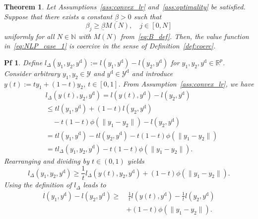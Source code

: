 \documentclass[10pt,a4paper]{amsart}
\newtheorem{thm}{Theorem}
\newtheorem{pf}{Pf}
\begin{document}
\begin{thm}\label{thm:coerc}	
	Let Assumptions~\ref{ass:convex_lr} and~\ref{ass:optimality} be satisfied.
	Suppose that there exists a constant $\underline{\beta}>0$ such that%
	\begin{equation}\label{eq:beta_lower_bound}
		\beta_j \geq \underline{\beta}M(N), \quad j\in[0,N]
	\end{equation}
	uniformly for all $N\in\mathbb{N}$ with $M(N)$ from~\eqref{eq:B_def}.
	Then, the value function in~\eqref{eq:NLP_case_1} is coercive in the sense of Definition~\ref{def:coerc}.
\end{thm}

\begin{pf}
	Define ${l}_\Delta(y_1,y_2,y^\mathrm{d}):= l(y_1,y^\mathrm{d}) - l(y_2,y^\mathrm{d})$ for $y_1,y_2,y^\mathrm{d}\in\mathbb{R}^p$.
	Consider arbitrary $y_1,y_2\in\mathcal{Y}$ and $y^\mathrm{d}\in\mathcal{Y}^\mathrm{d}$ and introduce $y(t) := ty_1 + (1-t)y_2$, $t\in[0,1]$.
	From Assumption~\ref{ass:convex_lr}, we have
	\begin{align*}
		&l_\Delta(y(t),y_2,y^\mathrm{d}) = l(y(t),y^\mathrm{d}) - l(y_2,y^\mathrm{d}) \\
		&\leq tl(y_1,y^\mathrm{d})+(1-t)l(y_2,y^\mathrm{d}) \\
		&\quad - t(1-t)\phi(\|y_1-y_2\|) - l(y_2,y^\mathrm{d})\\
		&= tl(y_1,y^\mathrm{d})-tl(y_2,y^\mathrm{d}) - t(1-t)\phi(\|y_1-y_2\|)\\
		&= tl_\Delta(y_1,y_2,y^\mathrm{d}) - t(1-t)\phi(\|y_1-y_2\|).
	\end{align*}
	Rearranging and dividing by $t\in(0,1)$ yields
	\begin{equation*}
		l_\Delta(y_1,y_2,y^\mathrm{d})  \geq \frac{1}{t}l_\Delta(y(t),y_2,y^\mathrm{d}) + (1-t)\phi(\|y_1-y_2\|).
	\end{equation*}
	Using the definition of $l_\Delta$ leads to
	\begin{equation}
		\begin{split}\label{eq:convexity_res1}
		l(y_1,y^\mathrm{d}) - l(y_2,y^\mathrm{d})
		\geq &\ \frac{1}{t}l(y(t),y^\mathrm{d}) - \frac{1}{t}l(y_2,y^\mathrm{d}) \\
		&+(1-t)\phi(\|y_1-y_2\|).
		\end{split}
	\end{equation}


\end{pf}
\end{document}
